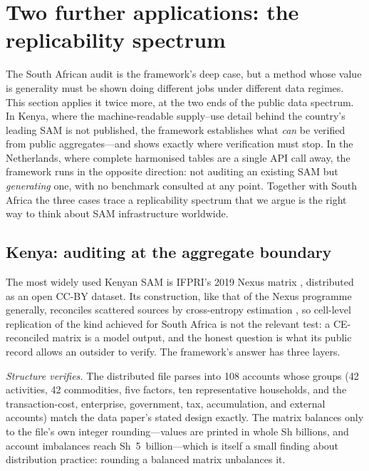 \section{Two further applications: the replicability spectrum}
\label{sec:applications}

The South African audit is the framework's deep case, but a method whose
value is generality must be shown doing different jobs under different data
regimes. This section applies it twice more, at the two ends of the public
data spectrum. In Kenya, where the machine-readable supply--use detail
behind the country's leading SAM is not published, the framework
establishes what \emph{can} be verified from public aggregates---and shows
exactly where verification must stop. In the Netherlands, where complete
harmonised tables are a single API call away, the framework runs in the
opposite direction: not auditing an existing SAM but \emph{generating} one,
with no benchmark consulted at any point. Together with South Africa the
three cases trace a replicability spectrum that we argue is the right way
to think about SAM infrastructure worldwide.

\subsection{Kenya: auditing at the aggregate boundary}
\label{sec:applications:kenya}

The most widely used Kenyan SAM is IFPRI's 2019 Nexus matrix
\citep{thurlow2021}, distributed as an open CC-BY dataset. Its
construction, like that of the Nexus programme generally, reconciles
scattered sources by cross-entropy estimation \citep{robinson2001}, so
cell-level replication of the kind achieved for South Africa is not the
relevant test: a CE-reconciled matrix is a model output, and the honest
question is what its public record allows an outsider to verify. The
framework's answer has three layers.

\emph{Structure verifies.} The distributed file parses into 108 accounts
whose groups (42 activities, 42 commodities, five factors, ten
representative households, and the transaction-cost, enterprise,
government, tax, accumulation, and external accounts) match the data
paper's stated design exactly. The matrix balances only to the file's own
integer rounding---values are printed in whole Sh billions, and account
imbalances reach Sh~5~billion---which is itself a small finding about
distribution practice: rounding a balanced matrix unbalances it.

